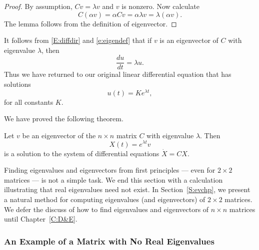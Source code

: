 \documentclass{ximera}
\begin{document}
\begin{proof} By assumption, $Cv=\lambda v$ and $v$ is nonzero. Now calculate
\[
C(\alpha v) = \alpha Cv = \alpha\lambda v = \lambda(\alpha v).
\]
The lemma follows from the definition of eigenvector.  \end{proof}

It follows from \eqref{E:diffdir} and \eqref{e:eigendef} that if $v$ is
an eigenvector of $C$ with eigenvalue $\lambda$, then
\[
\frac{du}{dt} = \lambda u.
\]
Thus we have returned to our original linear differential
equation that has solutions
\[
u(t) = Ke^{\lambda t},
\]
for all constants $K$.

We have proved the following theorem.
\begin{theorem}  \label{T:eigensoln}
Let $v$ be an eigenvector of the $n\times n$ matrix $C$ with
eigenvalue $\lambda$.  Then
\[
X(t) = e^{\lambda t}v
\]
is a solution to the system of differential equations $\dot{X}=CX$.
\end{theorem}



Finding eigenvalues and eigenvectors from first principles --- even for 
$2\times 2$ matrices --- is not a simple task.  We end this section with 
a calculation illustrating that real eigenvalues need not exist.  In 
Section~\ref{S:evchp}, we present a natural method for computing  
eigenvalues (and eigenvectors) of $2\times2$ matrices.  We defer the 
discuss of how to find eigenvalues and eigenvectors of $n\times n$ matrices 
until Chapter~\ref{C:D&E}.


\subsubsection*{An Example of a Matrix with No Real Eigenvalues}
\end{document}
